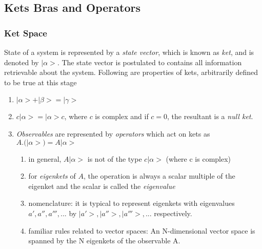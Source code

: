 \documentclass[12pt]{article}
\begin{document}
		\subsection{Kets Bras and Operators}
			\subsubsection{Ket Space}
				State of a system is represented by a \emph{state vector}, which is known as \emph{ket}, and is denoted by $|\alpha>$. The state vector is postulated to contains all information retrievable about the system. Following are properties of kets, arbitrarily defined to be true at this stage
				\begin{enumerate}
					\item $|\alpha> + |\beta> = |\gamma>$
					\item $c|\alpha> = |\alpha> c$, where $c$ is complex and if $c=0$, the resultant is a \emph{null ket}.
					\item \emph{Observables} are represented by \emph{operators} which act on kets as $A.(|\alpha>) = A|\alpha>$
						\begin{enumerate}
							\item in general, $A|\alpha>$ is not of the type $c|\alpha>$ (where c is complex)
							\item for \emph{eigenkets} of $A$, the operation is always a scalar multiple of the eigenket and the scalar is called the \emph{eigenvalue}
							\item nomenclature: it is typical to represent eigenkets with eigenvalues ${a',a'',a''',...}$ by ${|a'>,|a''>,|a'''>,...}$ respectively.
							\item familiar rules related to vector spaces: An N-dimensional vector space is spanned by the N eigenkets of the observable A.
						\end{enumerate}
				\end{enumerate}
\end{document}
